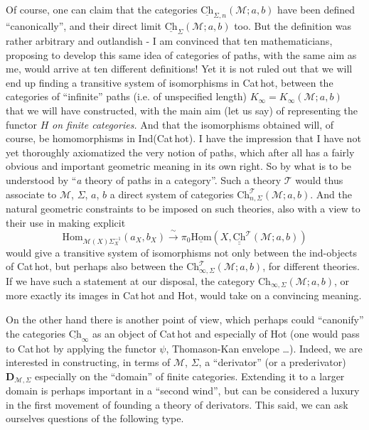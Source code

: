 \documentclass[11pt]{article}
\newcommand{\msp}[1]{\marginpar{\footnotesize [#1]}}
\newcommand{\uHom}{\underline{\mathrm{Hom}}}
\newcommand{\uCh}{\underline{\mathrm{Ch}}}
\newcommand{\Hom}{\mathrm{Hom}}
\newcommand{\Ch}{\mathrm{Ch}}
\newcommand{\Chh}{\underline{\underline{\mathrm{Ch}}}}
\begin{document}
Of course, one can claim that the categories $\uCh_{\Sigma,n}(\mathcal{M}; a, b)$ have been defined ``canonically'', and their direct limit $\uCh_{\Sigma}(\mathcal{M}; a, b)$ too. But the definition was rather arbitrary and outlandish - I am convinced that ten mathematicians, proposing to develop this same idea of categories of paths, with the same aim as me, would arrive at ten different definitions! Yet it is not ruled out that we will end up finding a transitive system of isomorphisms in Cat\,hot, between the categories of ``infinite'' paths (i.e. of unspecified length) $K_\infty = K_\infty(\mathcal{M}; a, b)$ that we will have constructed, with the
\msp{page 50}
main aim (let us say) of representing the functor $H$ \textit{on finite categories.} And that the isomorphisms obtained will, of course, be homomorphisms in Ind(Cat\,hot). I have the impression that I have not yet thoroughly axiomatized the very notion of paths, which after all has a fairly obvious and important geometric meaning in its own right. So by what is to be understood by ``\textit{a} theory of paths in a category''. Such a theory $\mathcal{T}$ would thus associate to $\mathcal{M}$, $\Sigma$, $a$, $b$ a direct system of categories $\Ch^{\mathcal{T}}_{n,\Sigma}(\mathcal{M}; a, b)$. And the natural geometric constraints to be imposed on such theories, also with a view to their use in making explicit
\[
\Hom_{\mathcal{M}(X)\Sigma_X^{-1}}(a_X, b_X) \xrightarrow{\ \sim\ } \pi_0\uHom(X, \Chh^{\mathcal{T}}(\mathcal{M}; a, b)) %
\]
would give a transitive system of isomorphisms not only between the ind-objects of Cat\,hot, but perhaps also between the $\Ch^{\mathcal{T}}_{\infty,\Sigma}(\mathcal{M}; a, b)$, for different theories. If we have such a statement at our disposal, the category $\Ch_{\infty,\Sigma}(\mathcal{M}; a, b)$, or more exactly its images in Cat\,hot and Hot, %
\msp{page 51}
would take on a convincing meaning.

On the other hand there is another point of view, which perhaps could ``canonify'' the categories $\uCh_\infty$ as an object of Cat\,hot and especially of Hot (one would pass to Cat\,hot by applying the functor $\psi$, Thomason-Kan envelope \ldots). Indeed, we are interested in constructing, in terms of $\mathcal{M}$, $\Sigma$, a ``derivator'' (or a prederivator) $\mathbf{D}_{\mathcal{M},\Sigma}$ especially on the ``domain'' of finite categories. Extending it to a larger domain is perhaps important in a ``second wind'', but can be considered a luxury in the first movement of founding a theory of derivators. This said, we can ask ourselves questions of the following type.
\end{document}
